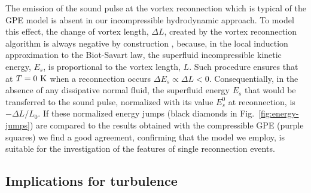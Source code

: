\documentclass[9pt,twocolumn,twoside]{pnas-new}
\begin{document}
The emission of the sound pulse at the vortex reconnection 
\cite{leadbeaterSoundEmissionDue2001b} which is typical of the GPE model
is absent in our incompressible hydrodynamic approach. To model
this effect, the change of vortex length, $\Delta L$, created by the
vortex reconnection algorithm is always negative by construction
\cite{baggaleySensitivityVortexFilament2012a},
because, in the local induction approximation to the Biot-Savart law, 
the superfluid incompressible kinetic energy, $E_s$, is proportional to the vortex length,
$L$. Such procedure ensures that at $T=0~{\rm K}$ when a reconnection occurs
$\Delta E_s\propto \Delta L < 0$.
Consequentially, in the absence of any dissipative normal fluid, 
the superfluid energy 
$E_s$ that would be transferred to the sound pulse, normalized with its value $E_s^0$ at 
reconnection, is $-\Delta L/L_0$. 
If these normalized energy jumps (black diamonds
in Fig.~\ref{fig:energy-jumps}) are compared to the results obtained with the 
compressible GPE \cite{villoisIrreversibleDynamicsVortex2020} (purple squares)
we find a good agreement, confirming that the model we employ, 
is suitable for the investigation of the features of single reconnection events.

\subsection*{Implications for turbulence}
\end{document}
